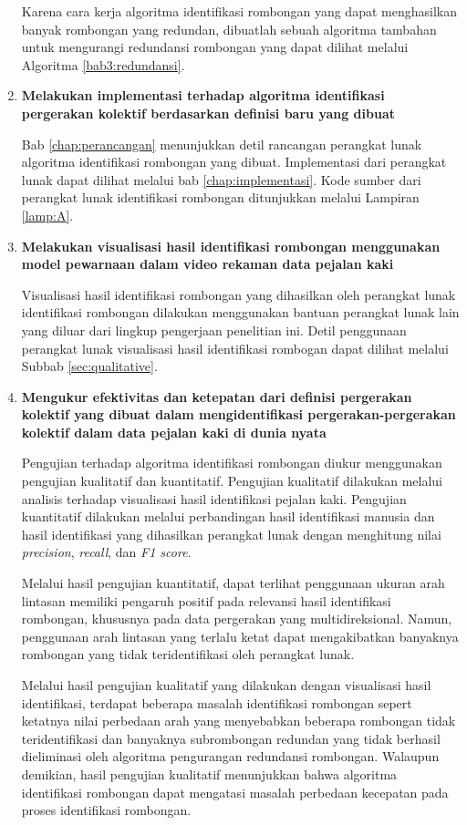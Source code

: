 \begin{enumerate}
    Karena cara kerja algoritma identifikasi rombongan yang dapat menghasilkan banyak rombongan yang redundan, dibuatlah sebuah algoritma tambahan untuk mengurangi redundansi rombongan yang dapat dilihat melalui Algoritma \ref{bab3:redundansi}.
    
    \item \textbf{Melakukan implementasi terhadap algoritma identifikasi pergerakan kolektif berdasarkan definisi baru yang dibuat}
    
    Bab \ref{chap:perancangan} menunjukkan detil rancangan perangkat lunak algoritma identifikasi rombongan yang dibuat. Implementasi dari perangkat lunak dapat dilihat melalui bab \ref{chap:implementasi}. Kode sumber dari perangkat lunak identifikasi rombongan ditunjukkan melalui Lampiran \ref{lamp:A}.
    
    \item \textbf{Melakukan visualisasi hasil identifikasi rombongan menggunakan model pewarnaan dalam video rekaman data pejalan kaki}
    
    Visualisasi hasil identifikasi rombongan yang dihasilkan oleh perangkat lunak identifikasi rombongan dilakukan menggunakan bantuan perangkat lunak lain yang diluar dari lingkup pengerjaan penelitian ini. Detil penggunaan perangkat lunak visualisasi hasil identifikasi rombogan dapat dilihat melalui Subbab \ref{sec:qualitative}.
    
    \item \textbf{Mengukur efektivitas dan ketepatan dari definisi pergerakan kolektif yang dibuat dalam mengidentifikasi pergerakan-pergerakan kolektif dalam data pejalan kaki di dunia nyata}
    
    Pengujian terhadap algoritma identifikasi rombongan diukur menggunakan pengujian kualitatif dan kuantitatif. Pengujian kualitatif dilakukan melalui analisis terhadap visualisasi hasil identifikasi pejalan kaki. Pengujian kuantitatif dilakukan melalui perbandingan hasil identifikasi manusia dan hasil identifikasi yang dihasilkan perangkat lunak dengan menghitung nilai \textit{precision}, \textit{recall}, dan \textit{F1 score}.
    
    Melalui hasil pengujian kuantitatif, dapat terlihat penggunaan ukuran arah lintasan memiliki pengaruh positif pada relevansi hasil identifikasi rombongan, khususnya pada data pergerakan yang multidireksional. Namun, penggunaan arah lintasan yang terlalu ketat dapat mengakibatkan banyaknya rombongan yang tidak teridentifikasi oleh perangkat lunak.
    
    Melalui hasil pengujian kualitatif yang dilakukan dengan visualisasi hasil identifikasi, terdapat beberapa masalah identifikasi rombongan sepert ketatnya nilai perbedaan arah yang menyebabkan beberapa rombongan tidak teridentifikasi dan banyaknya subrombongan redundan yang tidak berhasil dieliminasi oleh algoritma pengurangan redundansi rombongan. Walaupun demikian, hasil pengujian kualitatif menunjukkan bahwa algoritma identifikasi rombongan dapat mengatasi masalah perbedaan kecepatan pada proses identifikasi rombongan.
\end{enumerate}

